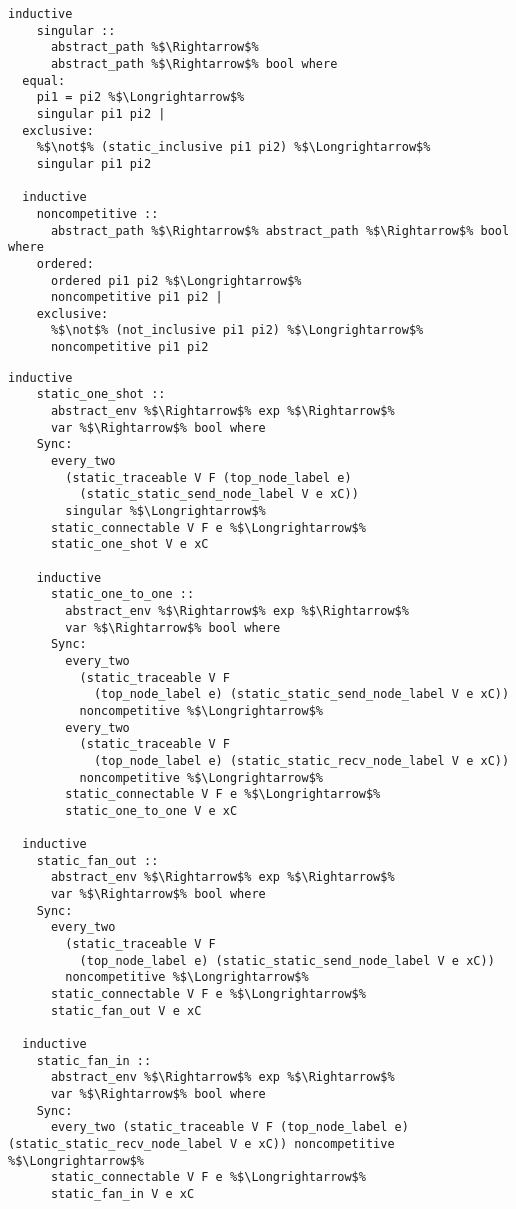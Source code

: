 \documentclass{article}
\begin{document}
\begin{lstlisting}[style=codestyle1, escapechar=\%]
  inductive
    singular ::
      abstract_path %$\Rightarrow$%
      abstract_path %$\Rightarrow$% bool where
  equal:
    pi1 = pi2 %$\Longrightarrow$% 
    singular pi1 pi2 |
  exclusive:
    %$\not$% (static_inclusive pi1 pi2) %$\Longrightarrow$% 
    singular pi1 pi2

  inductive
    noncompetitive ::
      abstract_path %$\Rightarrow$% abstract_path %$\Rightarrow$% bool where
    ordered:
      ordered pi1 pi2 %$\Longrightarrow$% 
      noncompetitive pi1 pi2 |
    exclusive:
      %$\not$% (not_inclusive pi1 pi2) %$\Longrightarrow$% 
      noncompetitive pi1 pi2
  \end{lstlisting}

\begin{lstlisting}[style=codestyle1, escapechar=\%]
  inductive
    static_one_shot ::
      abstract_env %$\Rightarrow$% exp %$\Rightarrow$%
      var %$\Rightarrow$% bool where
    Sync:
      every_two
        (static_traceable V F (top_node_label e)
          (static_static_send_node_label V e xC))
        singular %$\Longrightarrow$%
      static_connectable V F e %$\Longrightarrow$%
      static_one_shot V e xC 

    inductive
      static_one_to_one ::
        abstract_env %$\Rightarrow$% exp %$\Rightarrow$%
        var %$\Rightarrow$% bool where
      Sync:
        every_two
          (static_traceable V F
            (top_node_label e) (static_static_send_node_label V e xC))
          noncompetitive %$\Longrightarrow$%
        every_two
          (static_traceable V F
            (top_node_label e) (static_static_recv_node_label V e xC))
          noncompetitive %$\Longrightarrow$%
        static_connectable V F e %$\Longrightarrow$%
        static_one_to_one V e xC 

  inductive
    static_fan_out ::
      abstract_env %$\Rightarrow$% exp %$\Rightarrow$%
      var %$\Rightarrow$% bool where
    Sync:
      every_two
        (static_traceable V F
          (top_node_label e) (static_static_send_node_label V e xC))
        noncompetitive %$\Longrightarrow$%
      static_connectable V F e %$\Longrightarrow$%
      static_fan_out V e xC 

  inductive
    static_fan_in ::
      abstract_env %$\Rightarrow$% exp %$\Rightarrow$%
      var %$\Rightarrow$% bool where
    Sync:
      every_two (static_traceable V F (top_node_label e) (static_static_recv_node_label V e xC)) noncompetitive %$\Longrightarrow$%
      static_connectable V F e %$\Longrightarrow$%
      static_fan_in V e xC
    \end{lstlisting}
\end{document}
